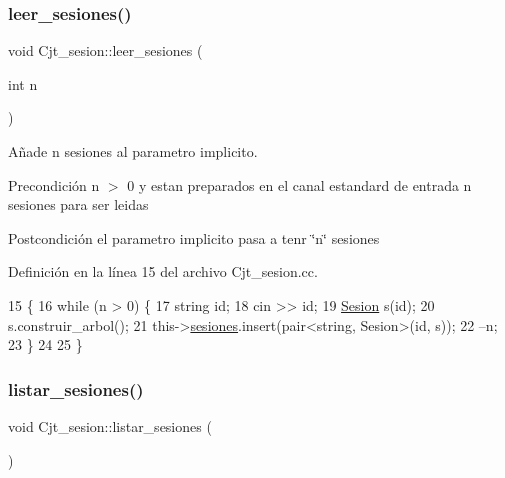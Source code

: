 \subsubsection{\texorpdfstring{leer\+\_\+sesiones()}{leer\_sesiones()}}
{\footnotesize\ttfamily void Cjt\+\_\+sesion\+::leer\+\_\+sesiones (\begin{DoxyParamCaption}\item[{int}]{n }\end{DoxyParamCaption})}



Añade n sesiones al parametro implicito. 

\begin{DoxyPrecond}{Precondición}
n $>$ 0 y estan preparados en el canal estandard de entrada n sesiones para ser leidas 
\end{DoxyPrecond}
\begin{DoxyPostcond}{Postcondición}
el parametro implicito pasa a tenr \char`\"{}n\char`\"{} sesiones 
\end{DoxyPostcond}


Definición en la línea 15 del archivo Cjt\+\_\+sesion.\+cc.


\begin{DoxyCode}
15                                     \{
16     \textcolor{keywordflow}{while} (n > 0) \{
17         \textcolor{keywordtype}{string} id;
18         cin >> id;
19         \mbox{\hyperlink{class_sesion}{Sesion}} s(\textcolor{keywordtype}{id});
20         s.construir\_arbol();
21         this->\mbox{\hyperlink{class_cjt__sesion_abac1c2ee3cccc598a8274c7da869aa9b}{sesiones}}.insert(pair<string, Sesion>(\textcolor{keywordtype}{id}, s));
22         --n;
23     \}
24 
25 \}
\end{DoxyCode}
\mbox{\label{class_cjt__sesion_ab16589173601c81f80305cd9a49b2f7b}} 
\subsubsection{\texorpdfstring{listar\+\_\+sesiones()}{listar\_sesiones()}}
{\footnotesize\ttfamily void Cjt\+\_\+sesion\+::listar\+\_\+sesiones (\begin{DoxyParamCaption}{ }\end{DoxyParamCaption})}



